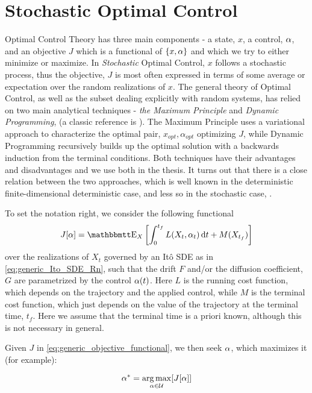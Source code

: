 \section{Stochastic Optimal Control}
Optimal Control Theory has three main components - a state, $x$, a control,
$\alpha$, and an objective $J$ which is a functional of $\{x,\alpha\}$ and which we try
to either minimize or maximize. In {\sl Stochastic} Optimal Control, $x$ follows
a stochastic process, thus the objective, $J$ is most often expressed in terms
of some average or expectation over the random realizations of $x$. The general
theory of Optimal Control, as well as the subset dealing explicitly with random
systems, has relied on two main analytical techniques - {\sl the Maximum
Principle} and {\sl Dynamic Programming}, (a classic reference is
\cite{Fleming1975}). The Maximum Principle uses a variational approach to
characterize the optimal pair, $x_{opt}, \alpha_{opt}$ optimizing $J$, while Dynamic Programming recursively builds up
the optimal solution with a backwards induction from the terminal conditions.
Both techniques have their advantages and disadvantages and we use both in the
thesis. It turns out that there is a close relation between the two approaches,
which is well known in the deterministic finite-dimensional deterministic case,
\cite{Fleming1975,Evansb} and less so in the stochastic case,
\cite{Annunziato2014}.

To set the notation right, we consider the following functional
\begin{equation}
J[\alpha] = \Exp_X \left[ \int_0^\tf L(X_t, \a_t) \intd{t} + M(X_\tf) \right]
\label{eq:generic_objective_functional} 
\end{equation} 
over the realizations of $X_t$ governed by an It\^o SDE as in
\cref{eq:generic_Ito_SDE_Rn}, such that the drift $F$ and/or the diffusion
coefficient, $G$ are parametrized by the control $\alpha(t)$. Here $L$ is the
running cost function, which depends on the trajectory and the applied control,
while $M$ is the terminal cost function, which just depends on the value of the
trajectory at the terminal time, $t_f$. Here we assume that the terminal time is
a priori known, although this is not necessary in general. 

Given $J$ in \cref{eq:generic_objective_functional}, we then seek $\alpha$, which
maximizes it (for example): 

\begin{equation}
\a^* = \argmax_{\a \in \Udomain} [ J[\a] ]
\label{eq:generic_optimization_statement}
\end{equation} 

